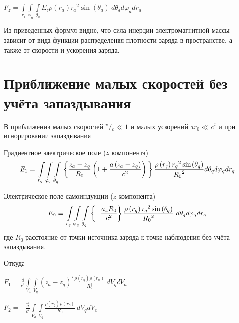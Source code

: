 \documentclass{article}
\begin{document}
${F}_{z}=\int\limits_{{{r}_{a}}}\int\limits_{{{\varphi}_{a}}}\int\limits_{{{\theta}_{a}}}{{E}_{z}\rho \left( {{r}_{a}} \right){{r}_{a}}^{2}\sin \left( {{\theta }_{a}} \right)}\ d{{\theta }_{a}}d{{\varphi }_{a}}d{{r}_{a}}$


Из приведенных формул видно, что сила инерции электромагнитной массы зависит от вида функции распределения плотности заряда в пространстве, а также от скорости и ускорения заряда.

\section{Приближение малых скоростей без учёта запаздывания}

В приближении малых скоростей ${}^{v}/{}_{c}\ll 1$  и малых ускорений $a{{r}_{0}}\ll {{c}^{2}}$ и при игнорировании запаздывания


Градиентное электрическое поле ($z$ компонента)
	\[{E}_{1}=\\
\int\limits_{{{r}_{q}}}\int\limits_{{{\varphi}_{q}}}\int\limits_{{{\theta}_{q}}}\\
\left\{ \frac{z_a-z_q}{{{R}_{0}}}\left( 1+\frac{a\left( {{z}_{a}}-{{z}_{q}} \right)}{c^2} \right) \\
 \right\}\\
\frac{\rho \left( {{r}_{q}} \right){{r}_{q}}^{2}\sin \left( {{\theta }_{q}} \right)}{{{R}_{0}}^{2}}\\
d{{\theta }_{q}}d{{\varphi }_{q}}d{{r}_{q}}\] 	

Электрическое поле самоиндукции ($z$ компонента)
\[{E}_{2}=\\
\int\limits_{{{r}_{q}}}\int\limits_{{{\varphi}_{q}}}\int\limits_{{{\theta}_{q}}}\\
{\left\{ -\frac{{a_z}R_{0}}{{{c}^{2}}} \right\}\\
\frac{\rho \left( {{r}_{q}} \right){{r}_{q}}^{2}\sin \left( {{\theta }_{q}} \right)}{{{R}_{0}}^{2}}\ }d{{\theta }_{q}}d{{\varphi }_{q}}d{{r}_{q}}\]
где ${R}_{0}$ расстояние от точки источника заряда к точке наблюдения без учёта запаздывания.

Откуда

${{F}_{1}}=\frac{\overrightarrow{a}}{{{c}^{^{2}}}}\int\limits_{{{V}_{a}}}{\int\limits_{{{V}_{q}}}{\left( {{z}_{a}}-{{z}_{q}} \right)^2\frac{\rho \left( {{r}_{q}} \right)\rho \left( {{r}_{a}} \right)}{R_{0}^3}}}\ d{{V}_{q}}d{{V}_{a}}$


${{F}_{2}}=-\frac{\overrightarrow{a}}{{{c}^{^{2}}}}\int\limits_{{{V}_{a}}}{\int\limits_{{{V}_{q}}}{\frac{\rho \left( {{r}_{q}} \right)\rho \left( {{r}_{a}} \right)}{R_{0}}}}\ d{{V}_{q}}d{{V}_{a}}$
\end{document}
